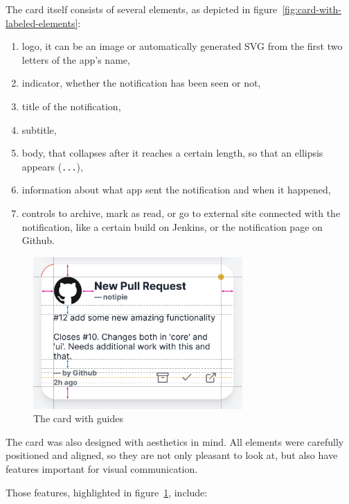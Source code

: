 The card itself consists of several elements,
as depicted in figure~\ref{fig:card-with-labeled-elements}:

\begin{enumerate}
      \item
            logo,
            it can be an image
            or automatically generated SVG
            from the first two letters of the app's name,
      \item
            indicator,
            whether the notification has been seen or not,
      \item
            title of the notification,
      \item
            subtitle,
      \item
            body,
            that collapses after it reaches a certain length,
            so that an ellipsis appears (\texttt{...}),
      \item
            information about what app sent the notification and when it happened,
      \item
            controls to archive,
            mark as read,
            or go to external site connected with the notification,
            like a certain build on Jenkins,
            or the notification page on Github.
\end{enumerate}

\begin{figure}[h]
      \centering
      \includegraphics[width=8cm,keepaspectratio]{./img/card_guides.png}
      \caption{The card with guides}
      \label{fig:card-with-guides}
\end{figure}

The card was also designed with aesthetics in mind.
All elements were carefully positioned and aligned,
so they are not only pleasant to look at,
but also have features important for visual communication.

Those features, highlighted in figure~\ref{fig:card-with-guides}, include:

